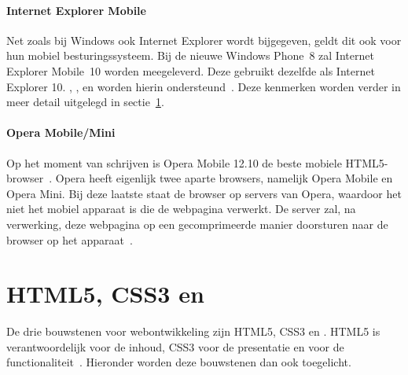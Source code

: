 \paragraph{Internet Explorer Mobile}
Net zoals bij Windows ook Internet Explorer wordt bijgegeven, geldt dit ook voor hun mobiel  besturingssysteem. 
Bij de nieuwe Windows Phone~8 zal Internet Explorer Mobile~10 worden meegeleverd. 
Deze gebruikt dezelfde  als Internet Explorer 10. 
, ,  en  worden hierin ondersteund~\cite{Hales2012}.
Deze kenmerken worden verder in meer detail uitgelegd in sectie~\ref{sec:html5-css3-js}.

\paragraph{Opera Mobile/Mini}
Op het moment van schrijven is Opera Mobile 12.10 de beste mobiele HTML5-browser~\cite{Sights2012}. 
Opera heeft eigenlijk twee aparte browsers, namelijk Opera Mobile en Opera Mini. 
Bij deze laatste staat de browser  op servers van Opera, waardoor het niet het mobiel apparaat is die de webpagina verwerkt. 
De server zal, na verwerking, deze webpagina op een gecomprimeerde manier doorsturen naar de browser op het apparaat~\cite{PhilDutson2012}.



\section{HTML5, CSS3 en \js}
\label{sec:html5-css3-js}
De drie bouwstenen voor webontwikkeling zijn HTML5, CSS3 en \js{}. 
HTML5 is verantwoordelijk voor de inhoud, CSS3 voor de presentatie en \js{} voor de functionaliteit~\cite{PhilDutson2012}. 
Hieronder worden deze bouwstenen dan ook toegelicht.

